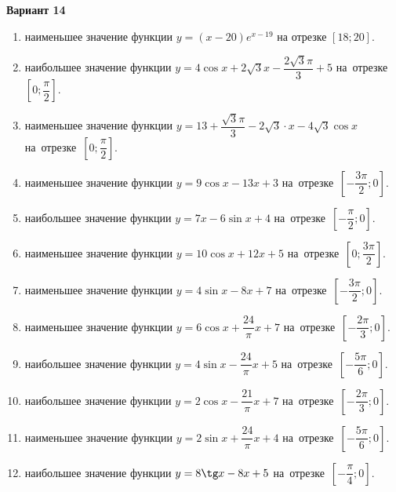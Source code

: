 \documentclass[a4paper,10pt]{article}
\begin{document}
\begin{center}\Large\textbf{Вариант 14}\end{center}

\begin{enumerate}
\item {} наименьшее значение функции $y=\left(x-20\right)e^{x-19}$ на отрезке $\left[18;20\right]$.

\item {} наибольшее значение функции $y=4\cos x+2\sqrt{3} x-\dfrac{2\sqrt{3} \pi }{3}+5$ на~отрезке~$\left[0;\dfrac{\pi }{2}\right]$.

\item {} наименьшее значение функции $y=13+\dfrac{\sqrt{3}\pi }{3}-2\sqrt{3}\cdot x-4\sqrt{3}\cos x$ на~отрезке~$\left[0;\dfrac{\pi }{2}\right]$.

\item {} наименьшее значение функции $y=9\cos x-13x+3$ на~отрезке~$\left[-\dfrac{3\pi }{2};0\right]$.

\item {} наибольшее значение функции $y=7x-6\sin x+4$ на~отрезке~$\left[-\dfrac{\pi }{2};0\right]$.

\item {} наименьшее значение функции $y=10\cos x+12x+5$ на~отрезке~$\left[0;\dfrac{3\pi }{2}\right]$.

\item {} наименьшее значение функции $y=4\sin x-8x+7$ на~отрезке~$\left[-\dfrac{3\pi }{2};0\right]$.

\item {} наименьшее значение функции $y=6\cos x+\dfrac{24}{\pi }x+7$ на~отрезке~$\left[-\dfrac{2\pi }{3};0\right]$.

\item {} наибольшее значение функции $y=4\sin x-\dfrac{24}{\pi }x+5$ на~отрезке~$\left[-\dfrac{5\pi }{6};0\right]$.

\item {} наибольшее значение функции $y=2\cos x-\dfrac{21}{\pi }x+7$ на~отрезке~$\left[-\dfrac{2\pi }{3};0\right]$.

\item {} наименьшее значение функции $y=2\sin x+\dfrac{24}{\pi }x+4$ на~отрезке~$\left[-\dfrac{5\pi }{6};0\right]$.

\item {} наибольшее значение функции $y=8\tg x-8x+5$ на~отрезке~$\left[-\dfrac{\pi }{4};0\right]$.


\end{enumerate}
\end{document}
